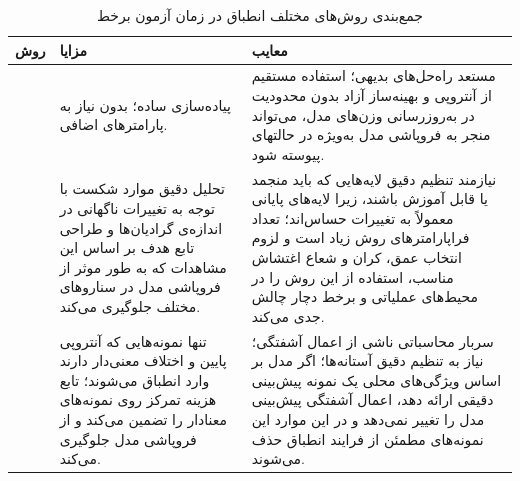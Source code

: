 \begin{table}[h!]
	\centering
	\small
	\caption{جمع‌بندی روش‌های مختلف انطباق در زمان آزمون برخط}
	\label{table:tta-comparison}
	\begin{tabular}{p{2.5cm} p{6cm} p{6cm}}
		\toprule
		\textbf{روش} & \textbf{مزایا} & \textbf{معایب} \\ 
		\midrule
		\lr{TENT}\cite{ftent} & پیاده‌سازی ساده؛ بدون نیاز به پارامترهای اضافی. & مستعد راه‌حل‌های بدیهی؛ استفاده مستقیم از آنتروپی و بهینه‌ساز آزاد بدون محدودیت در به‌روزرسانی وزن‌های مدل، می‌تواند منجر به فروپاشی مدل به‌ویژه در حالتهای پیوسته شود. \\ 
		\midrule
		\lr{SAR}\cite{sar} & تحلیل دقیق موارد شکست با توجه به تغییرات ناگهانی در اندازه‌ی گرادیان‌ها و طراحی تابع هدف بر اساس این مشاهدات که به طور موثر از فروپاشی مدل در سنارو‌های مختلف جلوگیری می‌کند.& نیازمند تنظیم دقیق لایه‌هایی که باید منجمد یا قابل آموزش باشند، زیرا لایه‌های پایانی معمولاً به تغییرات حساس‌اند؛ تعداد فرا‌پارامتر‌های روش زیاد است و لزوم انتخاب عمق، کران و شعاع اغتشاش مناسب، استفاده از این روش را در محیط‌های عملیاتی و برخط دچار چالش جدی می‌کند. \\ 
		\midrule
		\lr{DeYo}\cite{deyo} & تنها نمونه‌هایی که آنتروپی پایین و اختلاف معنی‌دار دارند وارد انطباق می‌شوند؛ تابع هزینه تمرکز روی نمونه‌های معنادار را تضمین می‌کند و از فروپاشی مدل جلوگیری می‌کند. & سربار محاسباتی ناشی از اعمال آشفتگی؛ نیاز به تنظیم دقیق آستانه‌ها؛ اگر مدل بر اساس ویژگی‌های محلی یک نمونه پیش‌بینی دقیقی ارائه دهد، اعمال آشفتگی پیش‌بینی مدل را تغییر نمی‌دهد و در این موارد این نمونه‌های مطمئن از فرایند انطباق حذف می‌شوند. \\ 
		\bottomrule
	\end{tabular}
\end{table}

